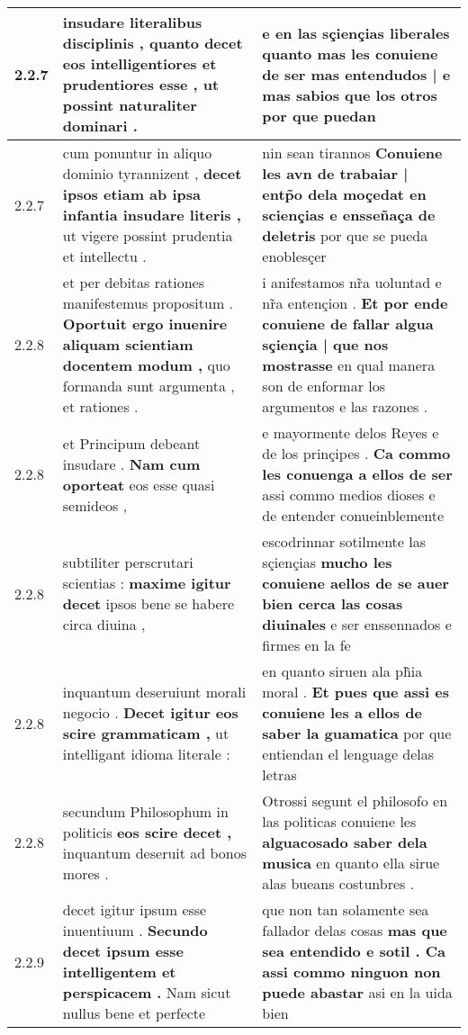 \begin{tabular}{|p{1cm}|p{6.5cm}|p{6.5cm}|}
2.2.7 & insudare literalibus disciplinis , \textbf{ quanto decet eos intelligentiores et prudentiores esse , } ut possint naturaliter dominari . & e en las sçiençias liberales \textbf{ quanto mas les conuiene de ser mas entendudos | e mas sabios que los otros } por que puedan \\\hline
2.2.7 & cum ponuntur in aliquo dominio tyrannizent , \textbf{ decet ipsos etiam ab ipsa infantia insudare literis , } ut vigere possint prudentia et intellectu . & nin sean tirannos \textbf{ Conuiene les avn de trabaiar | entp̃o dela moçedat en sciençias e ensseñaça de deletris } por que se pueda enoblesçer \\\hline
2.2.8 & et per debitas rationes manifestemus propositum . \textbf{ Oportuit ergo inuenire aliquam scientiam docentem modum , } quo formanda sunt argumenta , et rationes . & i anifestamos nr̃a uoluntad e nr̃a entençion . \textbf{ Et por ende conuiene de fallar algua sçiençia | que nos mostrasse } en qual manera son de enformar los argumentos e las razones . \\\hline
2.2.8 & et Principum debeant insudare . \textbf{ Nam cum oporteat } eos esse quasi semideos , & e mayormente delos Reyes e de los prinçipes . \textbf{ Ca commo les conuenga a ellos de ser } assi commo medios dioses e de entender conueinblemente \\\hline
2.2.8 & subtiliter perscrutari scientias : \textbf{ maxime igitur decet } ipsos bene se habere circa diuina , & escodrinnar sotilmente las sçiençias \textbf{ mucho les conuiene aellos de se auer bien cerca las cosas diuinales } e ser enssennados e firmes en la fe \\\hline
2.2.8 & inquantum deseruiunt morali negocio . \textbf{ Decet igitur eos scire grammaticam , } ut intelligant idioma literale : & en quanto siruen ala ph̃ia moral . \textbf{ Et pues que assi es conuiene les a ellos de saber la guamatica } por que entiendan el lenguage delas letras \\\hline
2.2.8 & secundum Philosophum in politicis \textbf{ eos scire decet , } inquantum deseruit ad bonos mores . & Otrossi segunt el philosofo en las politicas conuiene les \textbf{ alguacosado saber dela musica } en quanto ella sirue alas bueans costunbres . \\\hline
2.2.9 & decet igitur ipsum esse inuentiuum . \textbf{ Secundo decet ipsum esse intelligentem et perspicacem . } Nam sicut nullus bene et perfecte & que non tan solamente sea fallador delas cosas \textbf{ mas que sea entendido e sotil . Ca assi commo ninguon non puede abastar } asi en la uida bien \\\hline

\end{tabular}
